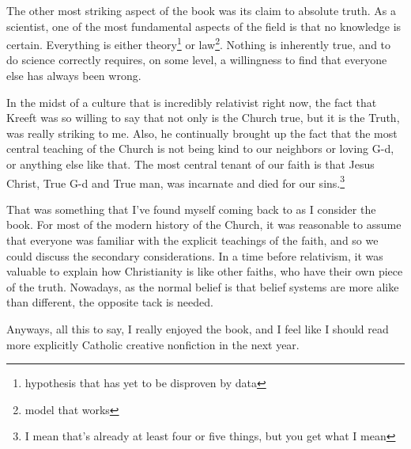 \documentclass[12pt]{article}[titlepage]
\newcommand{\1}{\={a}}
\newcommand{\2}{\={e}}
\newcommand{\3}{\={\i}}
\newcommand{\4}{\=o}
\newcommand{\5}{\=u}
\newcommand{\6}{\={A}}
\renewcommand{\,}{\textsuperscript{,}}
\begin{document}
The other most striking aspect of the book was its claim to absolute truth.
As a scientist, one of the most fundamental aspects of the field is that no knowledge is certain.
Everything is either theory\footnote{hypothesis that has yet to be disproven by data} or law\footnote{model that works}.
Nothing is inherently true, and to do science correctly requires, on some level, a willingness to find that everyone else has always been wrong.

In the midst of a culture that is incredibly relativist right now, the fact that Kreeft was so willing to say that not only is the Church true, but it is the Truth, was really striking to me.
Also, he continually brought up the fact that the most central teaching of the Church is not being kind to our neighbors or loving G-d, or anything else like that.
The most central tenant of our faith is that Jesus Christ, True G-d and True man, was incarnate and died for our sins.\footnote{I mean that's already at least four or five things, but you get what I mean}

That was something that I've found myself coming back to as I consider the book.
For most of the modern history of the Church, it was reasonable to assume that everyone was familiar with the explicit teachings of the faith, and so we could discuss the secondary considerations.
In a time before relativism, it was valuable to explain how Christianity is like other faiths, who have their own piece of the truth.
Nowadays, as the normal belief is that belief systems are more alike than different, the opposite tack is needed.

Anyways, all this to say, I really enjoyed the book, and I feel like I should read more explicitly Catholic creative nonfiction in the next year.
\end{document}
